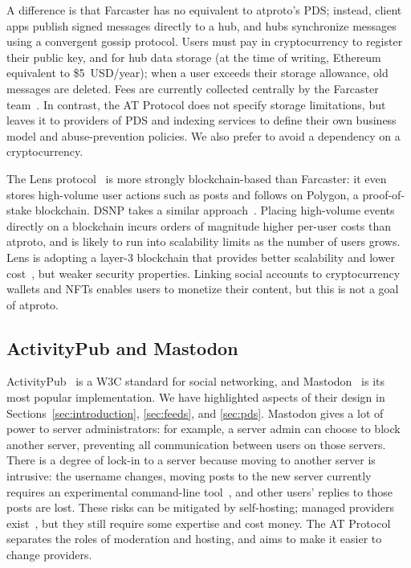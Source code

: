 \documentclass[sigconf,nonacm]{acmart}
\begin{document}
A difference is that Farcaster has no equivalent to atproto's PDS; instead, client apps publish signed messages directly to a hub, and hubs synchronize messages using a convergent gossip protocol.
Users must pay in cryptocurrency to register their public key, and for hub data storage (at the time of writing, Ethereum equivalent to \$5~USD/year); when a user exceeds their storage allowance, old messages are deleted.
Fees are currently collected centrally by the Farcaster team~\cite{FarcasterFees}.
In contrast, the AT Protocol does not specify storage limitations, but leaves it to providers of PDS and indexing services to define their own business model and abuse-prevention policies.
We also prefer to avoid a dependency on a cryptocurrency.

The Lens protocol~\cite{Lens} is more strongly blockchain-based than Farcaster: it even stores high-volume user actions such as posts and follows on Polygon, a proof-of-stake blockchain.
DSNP takes a similar approach~\cite{DSNP}.
Placing high-volume events directly on a blockchain incurs orders of magnitude higher per-user costs than atproto, and is likely to run into scalability limits as the number of users grows.
Lens is adopting a layer-3 blockchain that provides better scalability and lower cost~\cite{LensMomoka}, but weaker security properties.
Linking social accounts to cryptocurrency wallets and NFTs enables users to monetize their content, but this is not a goal of atproto.

\subsection{ActivityPub and Mastodon}

ActivityPub~\cite{ActivityPub} is a W3C standard for social networking, and Mastodon~\cite{Mastodon} is its most popular implementation.
We have highlighted aspects of their design in Sections~\ref{sec:introduction}, \ref{sec:feeds}, and \ref{sec:pds}.
Mastodon gives a lot of power to server administrators: for example, a server admin can choose to block another server, preventing all communication between users on those servers. %
There is a degree of lock-in to a server because moving to another server is intrusive: the username changes, moving posts to the new server currently requires an experimental command-line tool~\cite{MastodonPostMigration,MastodonContentMover}, and other users' replies to those posts are lost.
These risks can be mitigated by self-hosting; managed providers exist~\cite{MastodonHosting}, but they still require some expertise and cost money.
The AT Protocol separates the roles of moderation and hosting, and aims to make it easier to change providers.
\end{document}
